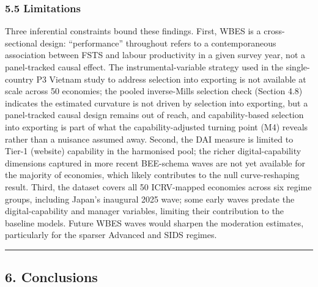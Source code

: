 \documentclass[
  12pt,a4paper]{article}
\begin{document}
\hypertarget{limitations}{%
\subsubsection{5.5 Limitations}\label{limitations}}

Three inferential constraints bound these findings. First, WBES is a
cross-sectional design: ``performance'' throughout refers to a
contemporaneous association between FSTS and labour productivity in a
given survey year, not a panel-tracked causal effect. The
instrumental-variable strategy used in the single-country P3 Vietnam
study to address selection into exporting is not available at scale
across 50 economies; the pooled inverse-Mills selection check (Section
4.8) indicates the estimated curvature is not driven by selection into
exporting, but a panel-tracked causal design remains out of reach, and
capability-based selection into exporting is part of what the
capability-adjusted turning point (M4) reveals rather than a nuisance
assumed away. Second, the DAI measure is limited to Tier-1 (website)
capability in the harmonised pool; the richer digital-capability
dimensions captured in more recent BEE-schema waves are not yet
available for the majority of economies, which likely contributes to the
null curve-reshaping result. Third, the dataset covers all 50
ICRV-mapped economies across six regime groups, including Japan's
inaugural 2025 wave; some early waves predate the digital-capability and
manager variables, limiting their contribution to the baseline models.
Future WBES waves would sharpen the moderation estimates, particularly
for the sparser Advanced and SIDS regimes.

\begin{center}\rule{0.5\linewidth}{0.5pt}\end{center}

\hypertarget{conclusions}{%
\subsection{6. Conclusions}\label{conclusions}}
\end{document}
